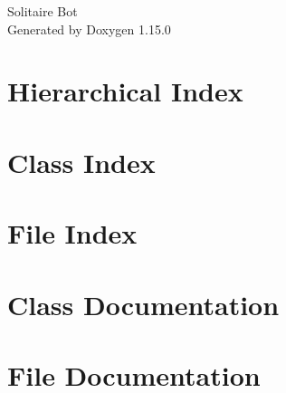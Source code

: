 \documentclass[twoside]{book}
\newcommand{\+}{\discretionary{\mbox{\scriptsize$\hookleftarrow$}}{}{}}
\newcommand{\clearemptydoublepage}{%
    \newpage{\pagestyle{empty}\cleardoublepage}%
  }
\begin{document}
  \raggedbottom
    \hypersetup{pageanchor=false,
                bookmarksnumbered=true,
                pdfencoding=unicode
               }
  \begin{titlepage}
  \vspace*{7cm}
  \begin{center}%
  {\Large Solitaire Bot}\\
  \vspace*{1cm}
  {\large Generated by Doxygen 1.15.0}\\
  \end{center}
  \end{titlepage}
  \clearemptydoublepage
  \tableofcontents
  \clearemptydoublepage
  \hypersetup{pageanchor=true}

\chapter{Hierarchical Index}

\chapter{Class Index}

\chapter{File Index}

\chapter{Class Documentation}




\chapter{File Documentation}




  \backmatter
  \newpage
  \clearemptydoublepage
  \printindex
\end{document}
